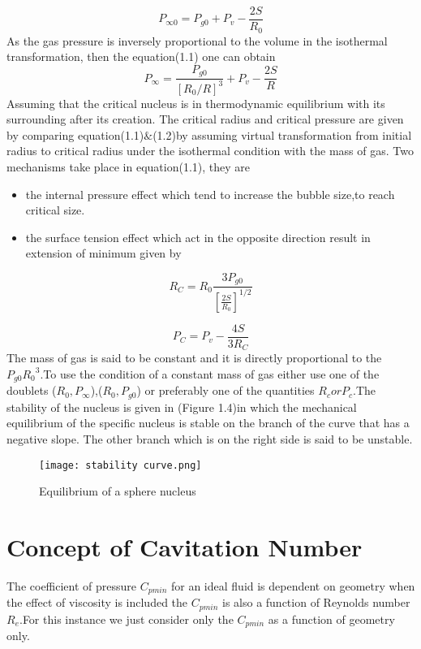  \begin{equation}
 P_{{\infty}{0}} =P_{g0}+P_v-\frac{2S}{R_0}
 \end{equation}
 As the gas pressure is inversely proportional to the volume in the isothermal transformation, then the equation(1.1) one can obtain
 \begin{equation}
      P_{\infty} =\frac{P_{g0}}{{[{R_0}/{R}]}^{3}} +P_v -\frac{2S}{R}
      \end{equation}
  Assuming that the critical nucleus is in thermodynamic equilibrium with its surrounding after its creation. The critical radius and critical pressure are given by comparing equation(1.1)$\&$(1.2)by assuming
  virtual transformation from initial radius to critical radius under the isothermal condition with the mass of gas. Two mechanisms take place in equation(1.1), they are
  \begin{itemize}
  \item the internal pressure effect which tend to increase the bubble size,to reach critical size.
  \item the surface tension effect which act in the opposite direction result in extension of minimum given by
  \end{itemize}
  \begin{equation}
  R_C = R_0 \frac {3P_{g0}}{[{\frac{2S}{R_0}}]^{1/2}}
  \end{equation}
  
  \begin{equation}
  P_C = P_v -{\frac{4S}{3R_C}}
  \end{equation}
  The mass of gas is said to be constant and it is directly proportional to the $P_{g0}{{R_0}^3}$.To use the condition of a constant mass of gas either use one of the doublets
   ($R_0 ,P_{\infty}$),($R_0,P_{g0}$) or preferably one of the quantities $R_c or P_c $.The stability of the nucleus is given in (Figure 1.4)in which the mechanical equilibrium of the specific nucleus 
   is stable on the branch of the curve that has a negative slope. The other branch which is on the right side is said to be unstable.\\
   \begin{figure}[H]
    \centering
    \texttt{[image: stability curve.png]}
    \caption{Equilibrium of a sphere nucleus}
    \label{fig:fig4}
    \end{figure}
    \section{Concept of Cavitation Number}
     The coefficient of pressure $C_{pmin}$ for an ideal fluid is dependent on geometry when the effect of viscosity is included the $C_{pmin}$ is also a function of Reynolds number $R_e$.For this instance we just
    consider only the $C_{pmin}$ as a function of geometry only.
    
